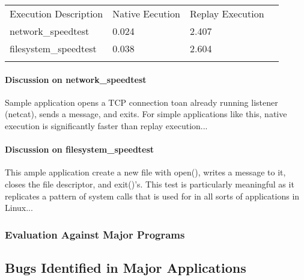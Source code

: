             \begin{table}[H]
                \scriptsize{}
                \begin{tabular}{l  l  l  l}
                    \toprule{}
                        Execution Description & Native Eecution & Replay Execution\\
                        network\_speedtest & 0.024 & 2.407 \\
                        filesystem\_speedtest & 0.038 & 2.604 \\
                    \bottomrule{}
                \end{tabular}
            \end{table}

        \paragraph{Discussion on network\_speedtest}

        Sample application opens a TCP connection toan already running listener (netcat), sends a message, and
        exits. For simple applications like this, native execution is significantly faster than replay execution...

        \paragraph{Discussion on filesystem\_speedtest}

        This ample application create a new file with open(), writes a message to it, closes the file descriptor, and
        exit()'s. This test is particularly meaningful as it replicates a pattern of system calls that is used for in
        all sorts of applications in Linux...
            
            
        \subsubsection{Evaluation Against Major Programs}





    \subsection{Bugs Identified in Major Applications}


